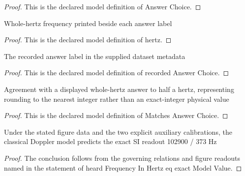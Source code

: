 \begin{proof}
  This is the declared model definition of Answer Choice.
\end{proof}
\begin{definition}[hertz]
  \label{def:physics:phyx-mini-0194:phyxminiproblems-problemphyxmini0194-answerchoice-hertz}
  Whole-hertz frequency printed beside each answer label
\end{definition}
\begin{proof}
  This is the declared model definition of hertz.
\end{proof}
\begin{definition}
  \label{def:physics:phyx-mini-0194:phyxminiproblems-problemphyxmini0194-recordedanswerchoice}
  The recorded answer label in the supplied dataset metadata
\end{definition}
\begin{proof}
  This is the declared model definition of recorded Answer Choice.
\end{proof}
\begin{definition}
  \label{def:physics:phyx-mini-0194:phyxminiproblems-problemphyxmini0194-matchesanswerchoice}
  Agreement with a displayed whole-hertz answer to half a hertz, representing rounding to the nearest integer rather than an exact-integer physical value
\end{definition}
\begin{proof}
  This is the declared model definition of Matches Answer Choice.
\end{proof}
\begin{lemma}
  \label{lem:physics:phyx-mini-0194:phyxminiproblems-problemphyxmini0194-heardfrequencyinhertz-eq-exactmodelvalue}
  Under the stated figure data and the two explicit auxiliary calibrations, the classical Doppler model predicts the exact SI readout 102900 / 373 Hz
\end{lemma}
\begin{proof}
  The conclusion follows from the governing relations and figure readouts named in the statement of heard Frequency In Hertz eq exact Model Value.
\end{proof}
